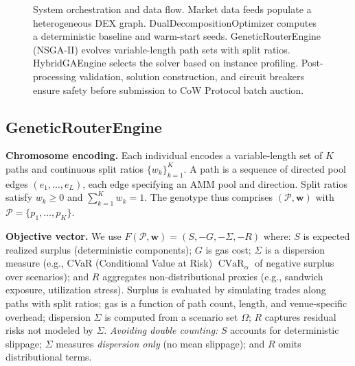 \documentclass[11pt]{article}
\DeclareMathOperator{\CVaR}{CVaR}
\newcommand{\1}{\mathbf{1}}  %
\begin{document}
\begin{figure}[t]
\caption{System orchestration and data flow. Market data feeds populate a heterogeneous DEX graph. DualDecompositionOptimizer computes a deterministic baseline and warm-start seeds. GeneticRouterEngine (NSGA-II) evolves variable-length path sets with split ratios. HybridGAEngine selects the solver based on instance profiling. Post-processing validation, solution construction, and circuit breakers ensure safety before submission to CoW Protocol batch auction.}
\label{fig:arch}
\end{figure}

\subsection{GeneticRouterEngine}
\textbf{Chromosome encoding.} Each individual encodes a variable-length set of $K$ paths and continuous split ratios $\{w_k\}_{k=1}^K$. A path is a sequence of directed pool edges $(e_1,\dots,e_L)$, each edge specifying an AMM pool and direction. Split ratios satisfy $w_k\ge 0$ and $\sum_{k=1}^K w_k = 1$. The genotype thus comprises $(\mathcal{P}, \mathbf{w})$ with $\mathcal{P}=\{p_1,\dots,p_K\}$.

\textbf{Objective vector.} We use $F(\mathcal{P},\mathbf{w}) = (S, -G, -\Sigma, -R)$ where: $S$ is expected realized surplus (deterministic components); $G$ is gas cost; $\Sigma$ is a dispersion measure (e.g., CVaR (Conditional Value at Risk) $\CVaR_{\alpha}$ of negative surplus over scenarios); and $R$ aggregates non-distributional proxies (e.g., sandwich exposure, utilization stress). Surplus is evaluated by simulating trades along paths with split ratios; gas is a function of path count, length, and venue-specific overhead; dispersion $\Sigma$ is computed from a scenario set $\Omega$; $R$ captures residual risks not modeled by $\Sigma$. \emph{Avoiding double counting:} $S$ accounts for deterministic slippage; $\Sigma$ measures \emph{dispersion only} (no mean slippage); and $R$ omits distributional terms.
\end{document}
